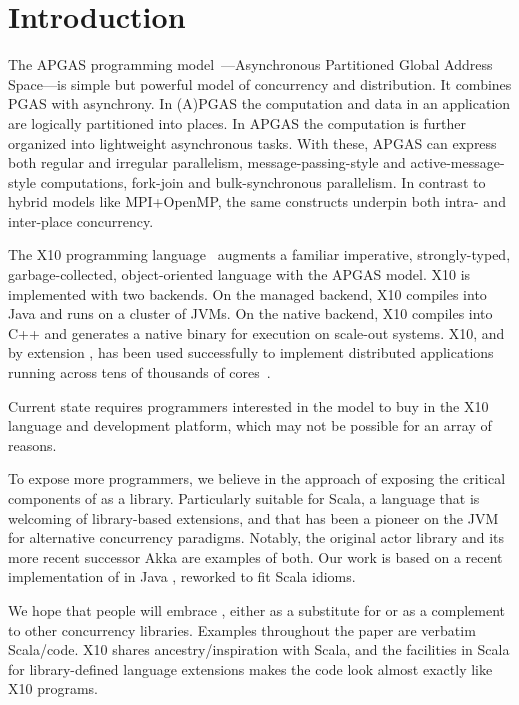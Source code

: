 \section{Introduction}

The APGAS programming model~\cite{amp10}---Asynchronous Partitioned Global Address Space---is simple but powerful
model of concurrency and distribution. It combines PGAS with asynchrony.
In (A)PGAS the computation and data in an application are logically partitioned into places.
In APGAS the computation is further organized into lightweight asynchronous tasks.
With these, APGAS can express both
regular and irregular parallelism, message-passing-style and
active-message-style computations, fork-join and bulk-synchronous
parallelism.  In contrast to hybrid models like MPI+OpenMP, the same
constructs underpin both intra- and inter-place concurrency.

The X10 programming language~\cite{oopsla05} augments a familiar imperative, strongly-typed, garbage-collected, object-oriented language with the APGAS model. X10 is implemented with two backends. On the managed backend, X10
compiles into Java and runs on a cluster of JVMs. On the native backend, X10 compiles into C++ and generates a native binary
for execution on scale-out systems.
X10, and by extension
\apgas, has been used successfully to implement distributed applications
running across tens of thousands of cores~\cite{TardieuETAL14X10ApgasAtPetascale}.


Current state requires programmers interested in the \apgas model to buy in the
X10 language and development platform, which may not be possible for an array
of reasons.

To expose more programmers, we believe in the approach of exposing the critical
components of \apgas as a library. Particularly suitable for Scala, a language
that is welcoming of library-based extensions, and that has been a pioneer on
the JVM for alternative concurrency paradigms. Notably, the original actor
library and its more recent successor Akka are examples of both. Our work is
based on a recent implementation of \apgas in Java \cite{APGASJava}, reworked to
fit Scala idioms.

We hope that people will embrace \apgas, either as a substitute for or as a
complement to other concurrency libraries. Examples throughout the paper are
verbatim Scala/\apgas code. X10 shares ancestry/inspiration with Scala, and the
facilities in Scala for library-defined language extensions makes the code look
almost exactly like X10 programs.

